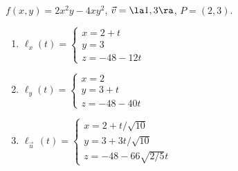 {$f(x,y) = 2x^2y-4xy^2$,  $\vec v = \la 1,3\ra$, $P=(2,3)$.\label{12_06_ex_05}
}
{\begin{enumerate}
	\item $\ell_x(t) = \left\{\begin{array}{l} x=2+t\\ y=3 \\ z = -48-12t\end{array}\right.$
	
	\item $\ell_y(t) = \left\{\begin{array}{l} x=2\\ y=3+t \\ z = -48-40t\end{array}\right.$
	
	\item $\ell_{\vec u\,}(t) = \left\{\begin{array}{l} x=2+t/\sqrt{10}\\ y=3+3t/\sqrt{10} \\ z = -48-66\sqrt{2/5}t\end{array}\right.$
\end{enumerate}
}